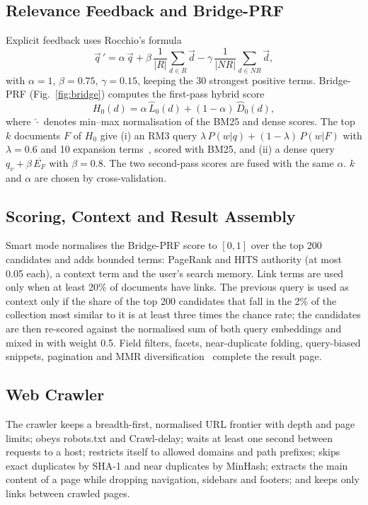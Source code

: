 \documentclass[conference]{IEEEtran}
\begin{document}
\subsection{Relevance Feedback and Bridge-PRF}
Explicit feedback uses Rocchio's formula~\cite{rocchio1971}
\begin{equation}
\vec q\,' = \alpha\,\vec q + \beta\,\frac{1}{|R|}\sum_{d\in R}\vec d - \gamma\,\frac{1}{|N\!R|}\sum_{d\in N\!R}\vec d,
\end{equation}
with $\alpha=1$, $\beta=0.75$, $\gamma=0.15$, keeping the 30 strongest positive terms. Bridge-PRF (Fig.~\ref{fig:bridge}) computes the first-pass hybrid score
\begin{equation}
H_0(d)=\alpha\,\widehat{L}_0(d)+(1-\alpha)\,\widehat{D}_0(d),
\end{equation}
where $\widehat{\cdot}$ denotes min--max normalisation of the BM25 and dense scores. The top $k$ documents $F$ of $H_0$ give (i) an RM3 query $\lambda\,P(w|q)+(1-\lambda)\,P(w|F)$ with $\lambda=0.6$ and 10 expansion terms~\cite{abduljaleel2004}, scored with BM25, and (ii) a dense query $q_v+\beta\,\overline{E_F}$ with $\beta=0.8$. The two second-pass scores are fused with the same $\alpha$. $k$ and $\alpha$ are chosen by cross-validation.

\subsection{Scoring, Context and Result Assembly}
Smart mode normalises the Bridge-PRF score to $[0,1]$ over the top 200 candidates and adds bounded terms: PageRank and HITS authority (at most 0.05 each), a context term and the user's search memory. Link terms are used only when at least 20\% of documents have links. The previous query is used as context only if the share of the top 200 candidates that fall in the 2\% of the collection most similar to it is at least three times the chance rate; the candidates are then re-scored against the normalised sum of both query embeddings and mixed in with weight 0.5. Field filters, facets, near-duplicate folding, query-biased snippets, pagination and MMR diversification~\cite{carbonell1998} complete the result page.

\subsection{Web Crawler}
The crawler keeps a breadth-first, normalised URL frontier with depth and page limits; obeys robots.txt and Crawl-delay; waits at least one second between requests to a host; restricts itself to allowed domains and path prefixes; skips exact duplicates by SHA-1 and near duplicates by MinHash; extracts the main content of a page while dropping navigation, sidebars and footers; and keeps only links between crawled pages.
\end{document}
